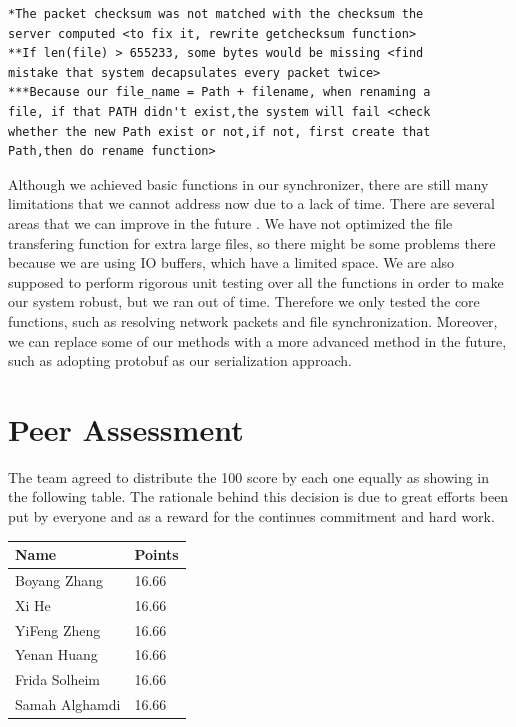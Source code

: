 \documentclass{article}
\begin{document}
\begin{lstlisting}
*The packet checksum was not matched with the checksum the
server computed <to fix it, rewrite getchecksum function>
**If len(file) > 655233, some bytes would be missing <find
mistake that system decapsulates every packet twice>
***Because our file_name = Path + filename, when renaming a
file, if that PATH didn't exist,the system will fail <check
whether the new Path exist or not,if not, first create that
Path,then do rename function>
\end{lstlisting}



\hfill \break
Although we achieved basic functions in our synchronizer, there are still many limitations that we cannot address now due to a lack of time. There are several areas that we can improve in the future . We have not optimized the file transfering function for extra large files, so there might be some problems there because we are using IO buffers, which have a limited space. We are also supposed to perform rigorous unit testing over all the functions in order to make our system robust, but we ran out of time. Therefore we only tested the core functions, such as resolving network packets and file synchronization. Moreover, we can replace some of our methods with a more advanced method in the future, such as adopting protobuf as our serialization approach.


\section{Peer Assessment}
The team agreed to distribute the 100 score by each one equally as showing in the following table. The rationale behind this decision is due to great efforts been put by everyone and as a reward for the continues commitment and hard work.


\begin{center}
\begin{tabular}{ | m{3cm}| m{1.3cm} | }
\hline
\textbf{Name} & \textbf{Points}  \\
\hline
Boyang Zhang & 16.66  \\
\hline
Xi He & 16.66  \\
\hline
YiFeng Zheng & 16.66 \\
\hline
Yenan Huang & 16.66 \\
\hline
Frida Solheim & 16.66 \\
\hline
Samah Alghamdi & 16.66 \\
\hline
\end{tabular}
\end{center}
\end{document}
